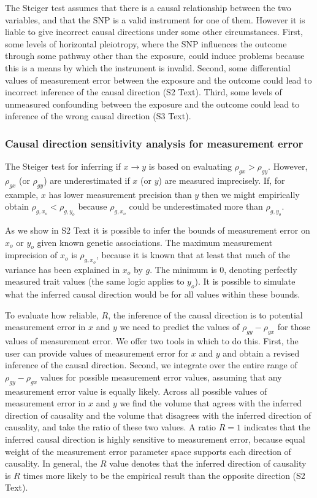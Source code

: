 \documentclass[]{article}
\begin{document}
The Steiger test assumes that there is a causal relationship between the
two variables, and that the SNP is a valid instrument for one of them.
However it is liable to give incorrect causal directions under some
other circumstances. First, some levels of horizontal pleiotropy, where
the SNP influences the outcome through some pathway other than the
exposure, could induce problems because this is a means by which the
instrument is invalid. Second, some differential values of measurement
error between the exposure and the outcome could lead to incorrect
inference of the causal direction (S2 Text). Third, some levels of
unmeasured confounding between the exposure and the outcome could lead
to inference of the wrong causal direction (S3 Text).

\subsubsection{Causal direction sensitivity analysis for measurement
error}\label{causal-direction-sensitivity-analysis-for-measurement-error}

The Steiger test for inferring if \(x \rightarrow y\) is based on
evaluating \(\rho_{gx} > \rho_{gy}\). However, \(\rho_{gx}\) (or
\(\rho_{gy}\)) are underestimated if \(x\) (or \(y\)) are measured
imprecisely. If, for example, \(x\) has lower measurement precision than
\(y\) then we might empirically obtain \(\rho_{g,x_o} < \rho_{g,y_o}\)
because \(\rho_{g,x_o}\) could be underestimated more than
\(\rho_{g,y_o}\).

As we show in S2 Text it is possible to infer the bounds of measurement
error on \(x_o\) or \(y_o\) given known genetic associations. The
maximum measurement imprecision of \(x_o\) is \(\rho_{g,x_o}\), because
it is known that at least that much of the variance has been explained
in \(x_o\) by \(g\). The minimum is 0, denoting perfectly measured trait
values (the same logic applies to \(y_o\)). It is possible to simulate
what the inferred causal direction would be for all values within these
bounds.

To evaluate how reliable, \(R\), the inference of the causal direction
is to potential measurement error in \(x\) and \(y\) we need to predict
the values of \(\rho_{gy} - \rho_{gx}\) for those values of measurement
error. We offer two tools in which to do this. First, the user can
provide values of measurement error for \(x\) and \(y\) and obtain a
revised inference of the causal direction. Second, we integrate over the
entire range of \(\rho_{gy} - \rho_{gx}\) values for possible
measurement error values, assuming that any measurement error value is
equally likely. Across all possible values of measurement error in \(x\)
and \(y\) we find the volume that agrees with the inferred direction of
causality and the volume that disagrees with the inferred direction of
causality, and take the ratio of these two values. A ratio \(R=1\)
indicates that the inferred causal direction is highly sensitive to
measurement error, because equal weight of the measurement error
parameter space supports each direction of causality. In general, the
\(R\) value denotes that the inferred direction of causality is \(R\)
times more likely to be the empirical result than the opposite direction
(S2 Text).
\end{document}
